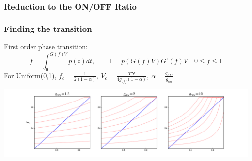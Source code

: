 \documentclass[mathserif]{beamer}
\begin{document}
\begin{frame}
\frametitle{Reduction to the ON/OFF Ratio}
\begin{center}



\end{center}
\end{frame}


\begin{frame}
\frametitle{Finding the transition}
First order phase transition:
$$f = \int_0^{G(f)V} p(t) dt,  \quad\quad 1 = p(G(f)V)G'(f)V \quad 0 \le f \le 1$$
For Uniform(0,1),
$f_c = \frac{1}{2(1-\alpha)}, \: V_c = \frac{TN}{4g_{off}(1-\alpha)},
 \: \alpha = \frac{g_{off}}{g_{on}}$

\vspace{0.25in}
\centering
\includegraphics[width=1.1\textwidth]{SC_1D_Uniform01.png}

\end{frame}
\end{document}
